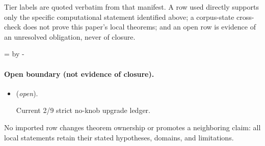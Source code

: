 \documentclass[11pt]{article}
\begin{document}
Tier labels are quoted verbatim from that manifest. A row used directly supports only the specific computational statement identified above; a corpus-state cross-check does not prove this paper's local theorems; and an open row is evidence of an unresolved obligation, never of closure.

\par\begingroup{}=\pagegoal\advance{} by -\pagetotal\ifdim\dimen0<7\baselineskip\newpage\fi\endgroup
\paragraph{Open boundary (not evidence of closure).}
\begin{itemize}
\setlength{\itemsep}{0.25em}
\item {} (\emph{open}).\par Current 2/9 strict no-knob upgrade ledger.
\end{itemize}

No imported row changes theorem ownership or promotes a neighboring claim: all local statements retain their stated hypotheses, domains, and limitations.


\end{document}
